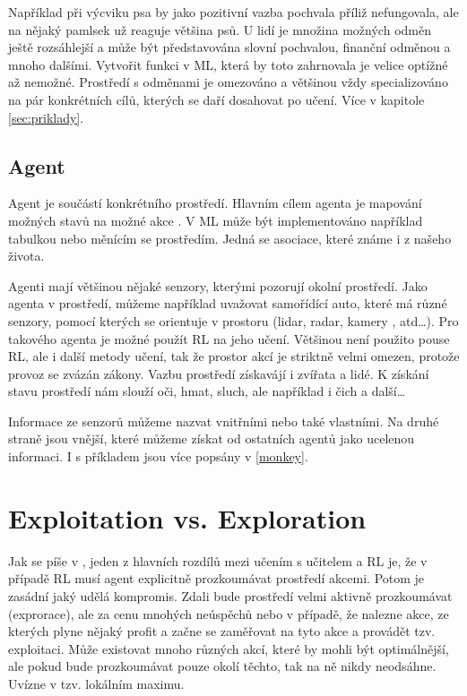 \documentclass{article}
\begin{document}
Například při výcviku psa by jako pozitivní vazba pochvala příliž nefungovala, ale na nějaký pamlsek už reaguje většina psů. U lidí je množina možných odměn ještě rozsáhlejší a může být představována slovní pochvalou, finanční odměnou a mnoho dalšími. Vytvořit funkci v ML, která by toto zahrnovala je velice optížné až nemožné. Prostředí s odměnami je omezováno a většinou vždy specializováno na pár konkrétních cílů, kterých se daří dosahovat po učení. Více v kapitole \ref{sec:priklady}.


\subsection{Agent}
\label{agent}
Agent je součástí konkrétního prostředí. Hlavním cílem agenta je mapování možných stavů na možné akce \cite{sutton1999reinforcement}. V ML může být implementováno například tabulkou nebo měnícím se prostředím. Jedná se asociace, které známe i z našeho života. 

Agenti mají většinou nějaké senzory, kterými pozorují okolní prostředí. Jako agenta v prostředí, můžeme například uvažovat samořídící auto, které má různé senzory, pomocí kterých se orientuje v prostoru (lidar, radar, kamery , atd\dots). Pro takového agenta je možné použít RL na jeho učení. Většinou není použito pouse RL, ale i další metody učení, tak že prostor akcí je striktně velmi omezen, protože provoz se zvázán zákony. Vazbu prostředí získavájí i zvířata a lidé. K získání stavu prostředí nám slouží oči, hmat, sluch, ale například i čich a další\dots 

Informace ze senzorů můžeme nazvat vnitřními nebo také vlastními. Na druhé straně jsou vnější, které můžeme získat od ostatních agentů jako ucelenou informaci. I s příkladem jsou více popsány v \ref{monkey}.


\section{Exploitation vs. Exploration}
Jak se píše v \cite{kaelbling1996reinforcement}, jeden z hlavních rozdílů mezi učením s učitelem a RL je, že v případě RL musí agent explicitně prozkoumávat prostředí akcemi. Potom je zasádní jaký udělá kompromis. Zdali bude prostředí velmi aktivně prozkoumávat (exprorace), ale za cenu mnohých neúspěchů nebo v případě, že nalezne akce, ze kterých plyne nějaký profit a začne se zaměřovat na tyto akce a provádět tzv. exploitaci. Může existovat mnoho různých akcí, které by mohli být optimálnější, ale pokud bude prozkoumávat pouze okolí těchto, tak na ně nikdy neodsáhne. Uvízne v tzv. lokálním maximu.
\end{document}
